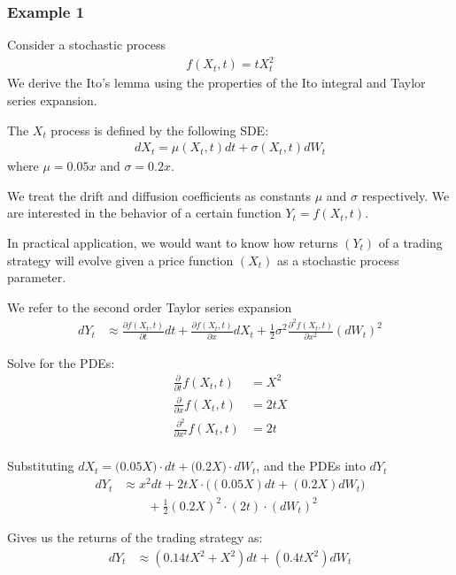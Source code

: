 \subsubsection*{Example 1}

Consider a stochastic process
\begin{align*}
f(X_t, t) = tX_t^2
\end{align*}
We derive the Ito's lemma using the properties of the Ito integral and Taylor series expansion. 

The $X_t$ process is defined by the following SDE:
\begin{align*}
dX_t = \mu(X_t,t)dt + \sigma(X_t,t)dW_t
\end{align*}
where $\mu= 0.05x$ and $\sigma= 0.2x$.

We treat the drift and diffusion coefficients as constants $\mu$ and $\sigma$ respectively. We are interested in the behavior of a certain function $Y_t=f(X_t, t)$. 

In practical application, we would want to know how returns $(Y_t)$ of a trading strategy will evolve given a price function $(X_t)$ as a stochastic process parameter.

We refer to the second order Taylor series expansion
\begin{align*}
dY_t &\approx \frac{\partial f(X_t,t)}{\partial t} dt
    + \frac{\partial f(X_t,t)}{\partial x} dX_t
    + \frac{1}{2} \sigma^2 \frac{\partial^2f(X_t,t)}{\partial x^2} (dW_t)^2
\end{align*}

Solve for the PDEs:
\begin{align*}
\frac{\partial}{\partial t} f(X_t,t) &= X^2\\
\frac{\partial}{\partial x} f(X_t,t) &= 2tX\\
\frac{\partial^2}{\partial x^2} f(X_t,t) &= 2t\\
\end{align*}

Substituting $dX_t = \big(0.05X\big)\cdot dt + \big(0.2X\big)\cdot dW_t$, and the PDEs into $dY_t$
\begin{align*}
dY_t &\approx x^2 dt
    + 2tX \cdot \big( (0.05X) dt + (0.2X) dW_t \big) \\
    &\qquad + \frac{1}{2}(0.2X)^2\cdot (2t)\cdot (dW_t)^2
\end{align*}

Gives us the returns of the trading strategy as:
\begin{align*}
dY_t &\approx \left(0.14tX^2 + X^2 \right)dt + \left(0.4tX^2 \right) dW_t
\end{align*}

